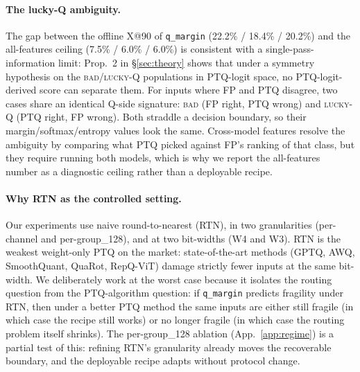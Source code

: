 \documentclass{article}
\newcommand{\fp}{\textsc{FP}\xspace}
\newcommand{\ptq}{\textsc{PTQ}\xspace}
\newcommand{\bad}{\textsc{bad}\xspace}
\newcommand{\luckyq}{\textsc{lucky-Q}\xspace}
\begin{document}
\paragraph{The lucky-Q ambiguity.}
The gap between the offline X@90 of \texttt{q\_margin} (22.2\% / 18.4\% / 20.2\%) and the all-features ceiling (7.5\% / 6.0\% / 6.0\%) is consistent with a single-pass-information limit: Prop.~2 in \S\ref{sec:theory} shows that under a symmetry hypothesis on the \bad{}/\luckyq{} populations in \ptq-logit space, no \ptq-logit-derived score can separate them. For inputs where \fp{} and \ptq{} disagree, two cases share an identical Q-side signature: \bad{} (\fp{} right, \ptq{} wrong) and \luckyq{} (\ptq{} right, \fp{} wrong). Both straddle a decision boundary, so their margin/softmax/entropy values look the same. Cross-model features resolve the ambiguity by comparing what \ptq{} picked against \fp's ranking of that class, but they require running both models, which is why we report the all-features number as a diagnostic ceiling rather than a deployable recipe.

\paragraph{Why RTN as the controlled setting.}
Our experiments use naive round-to-nearest (RTN), in two granularities (per-channel and per-group\_128), and at two bit-widths (W4 and W3). RTN is the weakest weight-only PTQ on the market: state-of-the-art methods (GPTQ, AWQ, SmoothQuant, QuaRot, RepQ-ViT) damage strictly fewer inputs at the same bit-width. We deliberately work at the worst case because it isolates the routing question from the PTQ-algorithm question: if \texttt{q\_margin} predicts fragility under RTN, then under a better PTQ method the same inputs are either still fragile (in which case the recipe still works) or no longer fragile (in which case the routing problem itself shrinks). The per-group\_128 ablation (App.~\ref{app:regime}) is a partial test of this: refining RTN's granularity already moves the recoverable boundary, and the deployable recipe adapts without protocol change.
\end{document}

